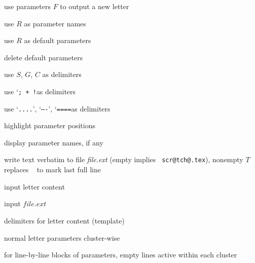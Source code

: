 {{\hruler


%
  {use parameters $F$ to output a new letter}


%
  {use $R$ as parameter names}

%
  {use $R$ as default parameters}

\entry{{\tt\string\delparadefaults}}%
  {delete default parameters}

\hruler


%
  {use $S$, $G$, $C$ as delimiters}


%
  {use \lq{\tt ; + !}\rqs as delimiters}


\entry{{\tt\string\blockmarks}}%
  {use \lq{\tt ....}\rq, \lq{\tt ----}\rq, \lq{\tt ====}\rqs as delimiters}

\hruler

\entry{{\tt\string\preview}}%
  {highlight parameter positions}

\entry{{\tt\string\showparas}}%
  {display parameter names, if any}

\hruler


%
  {write text verbatim to file {\it file.ext} (empty implies {\tt
scr@tch@.tex}), nonempty $T$ replaces {\tt
\string\endfile} to mark last full line}



%
  {input letter content}

%
  {input $file.ext$}

\hruler {} %
\hruler


%
  {delimiters for letter content (template)}

%
  {normal letter parameters cluster-wise}


%
  {for line-by-line blocks of parameters, empty lines active
within each cluster}


}}
